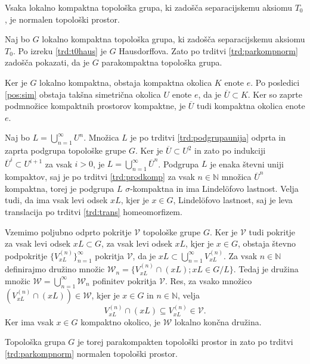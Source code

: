 \documentclass[mat1]{fmfdelo}
\newcommand{\N}{\mathbb N}
\newcommand{\closure}[1]{\overline{#1}}
\begin{document}
\begin{izrek}\label{izr:t4}
	Vsaka lokalno kompaktna topološka grupa, ki zadošča separacijskemu aksiomu $T_0$, je normalen topološki prostor.
\end{izrek}

\begin{dokaz}
Naj bo $G$ lokalno kompaktna topološka grupa, ki zadošča separacijskemu aksiomu $T_0$. Po izreku \ref{trd:t0haus} je $G$ Hausdorffova. Zato po trditvi \ref{trd:parkompnorm} zadošča pokazati, da je $G$ parakompaktna topološka grupa.

Ker je $G$ lokalno kompaktna, obstaja kompaktna okolica $K$ enote $e$. Po posledici \ref{pos:sim} obstaja takšna simetrična okolica $U$ enote $e$, da je $\closure{U} \subset K$. Ker so zaprte podmnožice kompaktnih prostorov kompaktne, je $\closure{U}$ tudi kompaktna okolica enote $e$.

Naj bo $L = \bigcup_{n=1}^\infty U^n$. Množica $L$ je po trditvi \ref{trd:podgrupaunija} odprta in zaprta podgrupa topološke grupe $G$. Ker je $\closure{U} \subset U^2$ in zato po indukciji $\closure{U}^i \subset U^{i+1}$ za vsak $i > 0$, je $L = \bigcup_{n=1}^\infty \closure{U}^n$. Podgrupa $L$ je enaka števni uniji kompaktov, saj je po trditvi \ref{trd:prodkomp} za vsak $n \in \N$ množica $\closure{U}^n$ kompaktna, torej je podgrupa $L$ $\sigma$-kompaktna in ima Lindel\"ofovo lastnost. Velja tudi, da ima vsak levi odsek $xL$, kjer je $x \in G$, Lindel\"ofovo lastnost, saj je leva translacija po trditvi \ref{trd:trans} homeomorfizem.

Vzemimo poljubno odprto pokritje $\mathcal{V}$ topološke grupe $G$. Ker je $\mathcal{V}$ tudi pokritje za vsak levi odsek $xL \subset G$, za vsak levi odsek $xL$, kjer je $x \in G$, obstaja števno podpokritje $\lbrace V_{xL}^{(n)} \rbrace_{n = 1}^{\infty}$ pokritja $\mathcal{V}$, da je $xL \subset \bigcup_{n=1}^{\infty}V_{xL}^{(n)}$. Za vsak $n \in \N$ definirajmo družino množic $\mathcal{W}_n = \lbrace V_{xL}^{(n)} \cap (xL) ; xL \in G/L \rbrace$. Tedaj je družina množic $\mathcal{W} = \bigcup_{n=1}^{\infty}\mathcal{W}_n$ pofinitev pokritja $\mathcal{V}$. Res, za vsako množico $(V_{xL}^{(n)} \cap (xL)) \in \mathcal{W}$, kjer je $x \in G$ in $n \in \N$, velja
\[ V_{xL}^{(n)} \cap (xL) \subseteq V_{xL}^{(n)} \in \mathcal{V}. \]
Ker ima vsak $x \in G$ kompaktno okolico, je $\mathcal{W}$ lokalno končna družina.

Topološka grupa $G$ je torej parakompakten topološki prostor in zato po trditvi \ref{trd:parkompnorm} normalen topološki prostor.
\end{dokaz}
\end{document}
